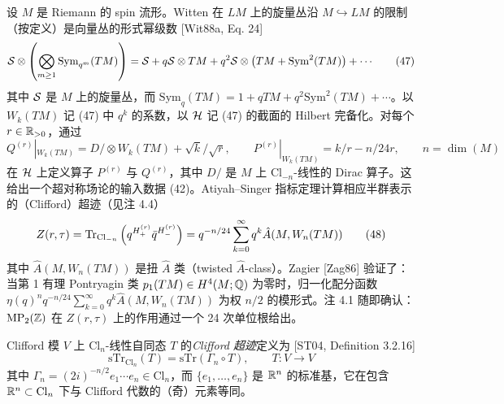 \begin{example}
设 $M$ 是 Riemann 的 spin 流形。Witten 在 $LM$ 上的旋量丛沿 $M\hookrightarrow LM$ 的限制（按定义）是向量丛的形式幂级数 [Wit88a, Eq. 24]
\begin{equation}
\mathcal{S}\otimes\left(\bigotimes_{m\ge1}\mathrm{Sym}_{q^m}(TM)\right)=\mathcal{S}+q\mathcal{S}\otimes TM+q^2\mathcal{S}\otimes\left(TM+\mathrm{Sym}^2(TM)\right)+\cdots
\tag{47}
\end{equation}
其中 $\mathcal{S}$ 是 $M$ 上的旋量丛，而 $\mathrm{Sym}_q(TM)=1+qTM+q^2\mathrm{Sym}^2(TM)+\cdots$。以 $W_k(TM)$ 记 (47) 中 $q^k$ 的系数，以 $\mathcal{H}$ 记 (47) 的截面的 Hilbert 完备化。对每个 $r\in\mathbb{R}_{>0}$，通过
\[
Q^{(r)}|_{W_k(TM)}=D\!\!\!/\otimes W_k(TM)+\sqrt{k}/\sqrt{r},\qquad P^{(r)}|_{W_k(TM)}=k/r-n/24r,\qquad n=\dim(M)
\]
在 $\mathcal{H}$ 上定义算子 $P^{(r)}$ 与 $Q^{(r)}$，其中 $D\!\!\!/$ 是 $M$ 上 $\mathrm{Cl}_{-n}$-线性的 Dirac 算子。这给出一个超对称场论的输入数据 (42)。Atiyah--Singer 指标定理计算相应半群表示的（Clifford）超迹（见注 4.4）
\begin{equation}
Z(r,\tau)=\operatorname{Tr}_{\mathrm{Cl}_{-n}}\left(q^{H^{(r)}_+}\bar q^{H^{(r)}_-}\right)=q^{-n/24}\sum_{k=0}^{\infty}q^k\hat A(M,W_n(TM))
\tag{48}
\end{equation}
其中 $\hat A(M,W_n(TM))$ 是扭 $\hat A$ 类（twisted $\hat A$-class）。Zagier [Zag86] 验证了：当第 1 有理 Pontryagin 类 $p_1(TM)\in H^4(M;\mathbb{Q})$ 为零时，归一化配分函数 $\eta(q)^n q^{-n/24}\sum_{k=0}^\infty q^k\hat A(M,W_n(TM))$ 为权 $n/2$ 的模形式。注 4.1 随即确认：$\operatorname{MP}_2(\mathbb{Z})$ 在 $Z(r,\tau)$ 上的作用通过一个 24 次单位根给出。
\end{example}


\begin{remark}[4.4]
Clifford 模 $V$ 上 $\mathrm{Cl}_n$-线性自同态 $T$ 的\emph{Clifford 超迹}定义为 [ST04, Definition 3.2.16]
\[
\mathrm{sTr}_{\mathrm{Cl}_n}(T)=\mathrm{sTr}(\Gamma_n\circ T),\qquad T\colon V\to V
\]
其中 $\Gamma_n=(2i)^{-n/2}e_1\cdots e_n\in\mathrm{Cl}_n$，而 $\{e_1,\dots,e_n\}$ 是 $\mathbb{R}^n$ 的标准基，它在包含 $\mathbb{R}^n\subset\mathrm{Cl}_n$ 下与 Clifford 代数的（奇）元素等同。
\end{remark}

